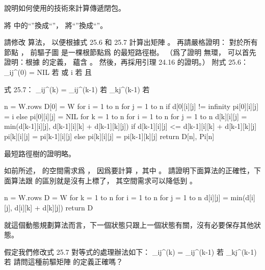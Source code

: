 \startEXERCISE
說明如何使用\insection[25.1] 的技術來計算傳遞閉包。
\stopEXERCISE

\startANSWER
將  中的“\m{\min}”換成“\m{\lor}”，
將“\m{+}”換成“\m{\land}”。
\stopANSWER

\startEXERCISE
請修改  算法，
以便根據式 25.6 和 25.7 計算出矩陣 。
再請嚴格證明：
對於所有節點 ，
前驅子圖  是一棵根節點爲  的最短路徑樹。
（\hint 爲了證明  無環，
可以首先證明：根據  的定義，
  蘊含 。
然後，再採用引理 24.16 的證明。）
附式 25.6：
\startformula
\pi_{ij}^{(0)} = \startcases
\NC NIL \NC 若  或  \NR
\NC i   \NC 若  且  \NR
\stopcases
\stopformula

式 25.7：
\startformula
\pi_{ij}^{(k)} = \startcases
\NC \pi_{ij}^{(k-1)} \NC 若  \NR
\NC \pi_{kj}^{(k-1)} \NC 若  \NR
\stopcases
\stopformula
\stopEXERCISE

\startANSWER
{}
\startCLRS
n = W.rows
D[0] = W
for i = 1 to n
	for j = 1 to n
		if d[0][i][j] != infinity
			pi[0][i][j] = i
		else
			pi[0][i][j] = NIL
for k = 1 to n
	for i = 1 to n
		for j = 1 to n
			d[k][i][j] = min(d[k-1][i][j], d[k-1][i][k] + d[k-1][k][j])
			if d[k-1][i][j] <= d[k-1][i][k] + d[k-1][k][j]
				pi[k][i][j] = pi[k-1][i][j]
			else
				pi[k][i][j] = pi[k-1][k][j]
return D[n], Pi[n]
\stopCLRS

最短路徑樹的證明略。
\stopANSWER

\startEXERCISE
如前所述，  的空間需求爲 ，
因爲要計算 ，其中 。
請證明下面算法的正確性，下面算法跟  的區別就是沒有上標了，
其空間需求可以降低到 。

\startCLRS
n = W.rows
D = W
for k = 1 to n
	for i = 1 to n
		for j = 1 to n
			d[i][j] = min(d[i][j], d[i][k] + d[k][j])
return D
\stopCLRS
\stopEXERCISE

\startANSWER
就這個動態規劃算法而言，下一個狀態只跟上一個狀態有關，沒有必要保存其他狀態。
\stopANSWER

\startEXERCISE
假定我們修改式 25.7 對等式的處理辦法如下：
\startformula
\pi_{ij}^{(k)} = \startcases
\NC \pi_{ij}^{(k-1)} \NC 若  \NR
\NC \pi_{kj}^{(k-1)} \NC 若  \NR
\stopcases
\stopformula
請問這種前驅矩陣 \m{\prod} 的定義正確嗎？
\stopEXERCISE

